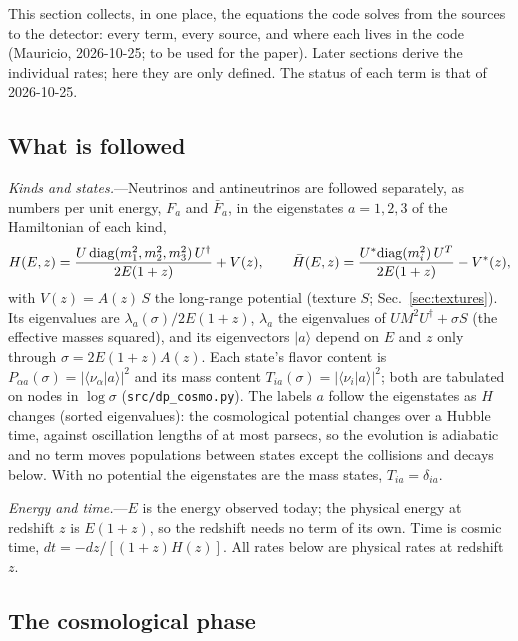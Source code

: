 \documentclass[11pt,a4paper]{article}
\newcommand{\file}[1]{\nolinkurl{#1}}
\begin{document}
This section collects, in one place, the equations the code solves from the sources to the detector: every term,
every source, and where each lives in the code (Mauricio, 2026-10-25; to be used for the paper). Later sections
derive the individual rates; here they are only defined. The status of each term is that of 2026-10-25.

\subsection{What is followed}

\textit{Kinds and states.}---Neutrinos and antineutrinos are followed separately, as numbers per unit energy, $F_a$ and
$\bar F_a$, in the eigenstates $a = 1, 2, 3$ of the Hamiltonian of each kind,
\begin{equation}
H(E, z) = \frac{U\,{\rm diag}(m_1^2, m_2^2, m_3^2)\,U^\dagger}{2E(1+z)} + V(z), \qquad
\bar H(E, z) = \frac{U^*{\rm diag}(m_i^2)\,U^T}{2E(1+z)} - V^*(z),
\end{equation}
with $V(z) = A(z)\,S$ the long-range potential (texture $S$; Sec.~\ref{sec:textures}). Its eigenvalues are
$\lambda_a(\sigma)/2E(1+z)$, $\lambda_a$ the eigenvalues of $UM^2U^\dagger + \sigma S$ (the effective masses squared),
and its eigenvectors $|a\rangle$ depend on $E$ and $z$ only through $\sigma = 2E(1+z)A(z)$. Each state's flavor content
is $P_{\alpha a}(\sigma) = |\langle\nu_\alpha|a\rangle|^2$ and its mass content $T_{ia}(\sigma) = |\langle\nu_i|a\rangle|^2$;
both are tabulated on nodes in $\log\sigma$ (\file{src/dp\_cosmo.py}). The labels $a$ follow the eigenstates as $H$
changes (sorted eigenvalues): the cosmological potential changes over a Hubble time, against oscillation lengths of at
most parsecs, so the evolution is adiabatic and no term moves populations between states except the collisions and
decays below. With no potential the eigenstates are the mass states, $T_{ia} = \delta_{ia}$.

\textit{Energy and time.}---$E$ is the energy observed today; the physical energy at redshift $z$ is $E(1+z)$, so
the redshift needs no term of its own. Time is cosmic time, $dt = -dz/[(1+z)H(z)]$. All rates below are physical
rates at redshift $z$.

\subsection{The cosmological phase}
\end{document}
